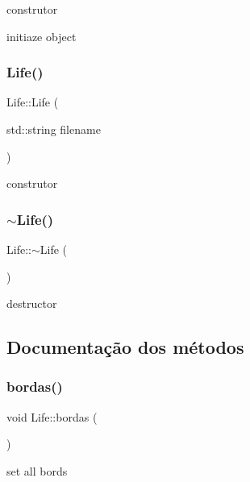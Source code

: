 construtor 

initiaze object \mbox{\label{classLife_a7bd6ea2ee09bf001bbbd58c6eef26e24}} 
\subsubsection{\texorpdfstring{Life()}{Life()}\hspace{0.1cm}{\footnotesize\ttfamily [2/2]}}
{\footnotesize\ttfamily Life\+::\+Life (\begin{DoxyParamCaption}\item[{std\+::string}]{filename }\end{DoxyParamCaption})}



construtor 

\mbox{\label{classLife_ac5a521e06906fb4f834001b2b4f7adc7}} 
\subsubsection{\texorpdfstring{$\sim$\+Life()}{~Life()}}
{\footnotesize\ttfamily Life\+::$\sim$\+Life (\begin{DoxyParamCaption}{ }\end{DoxyParamCaption})}



destructor 



\subsection{Documentação dos métodos}
\mbox{\label{classLife_a80aac6b6b00f8cf0589207953f3f844b}} 
\subsubsection{\texorpdfstring{bordas()}{bordas()}}
{\footnotesize\ttfamily void Life\+::bordas (\begin{DoxyParamCaption}{ }\end{DoxyParamCaption})}



set all bords 

